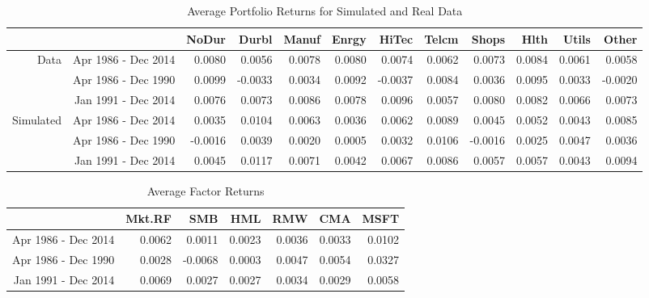 \documentclass[12pt]{article}
\begin{document}
\begin{table}[ht]
	\footnotesize
	\centering
	\begin{tabular}{rrrrrrrrrrrr}
		\hline
		& & NoDur & Durbl & Manuf & Enrgy & HiTec & Telcm & Shops & Hlth & Utils & Other \\ 
		\hline
		\multirow{3}{*}{Data} & Apr 1986 - Dec 2014 & 0.0080 & 0.0056 & 0.0078 & 0.0080 & 0.0074 & 0.0062 & 0.0073 & 0.0084 & 0.0061 & 0.0058 \\ 
		& Apr 1986 - Dec 1990 & 0.0099 & -0.0033 & 0.0034 & 0.0092 & -0.0037 & 0.0084 & 0.0036 & 0.0095 & 0.0033 & -0.0020 \\ 
		& Jan 1991 - Dec 2014 & 0.0076 & 0.0073 & 0.0086 & 0.0078 & 0.0096 & 0.0057 & 0.0080 & 0.0082 & 0.0066 & 0.0073 \\ 
		\hline
		\multirow{3}{*}{Simulated} & Apr 1986 - Dec 2014 & 0.0035 & 0.0104 & 0.0063 & 0.0036 & 0.0062 & 0.0089 & 0.0045 & 0.0052 & 0.0043 & 0.0085 \\ 
		& Apr 1986 - Dec 1990 & -0.0016 & 0.0039 & 0.0020 & 0.0005 & 0.0032 & 0.0106 & -0.0016 & 0.0025 & 0.0047 & 0.0036 \\ 
		& Jan 1991 - Dec 2014 & 0.0045 & 0.0117 & 0.0071 & 0.0042 & 0.0067 & 0.0086 & 0.0057 & 0.0057 & 0.0043 & 0.0094 \\ 
		\hline
	\end{tabular}
	\caption{Average Portfolio Returns for Simulated and Real Data}
\end{table}
\begin{table}[ht]
	\centering
	\footnotesize
	\begin{tabular}{rrrrrrr}
		\hline
		& Mkt.RF & SMB & HML & RMW & CMA & MSFT \\ 
		\hline
		 Apr 1986 - Dec 2014 & 0.0062 & 0.0011 & 0.0023 & 0.0036 & 0.0033 & 0.0102 \\ 
		Apr 1986 - Dec 1990 & 0.0028 & -0.0068 & 0.0003 & 0.0047 & 0.0054 & 0.0327 \\ 
		Jan 1991 - Dec 2014 & 0.0069 & 0.0027 & 0.0027 & 0.0034 & 0.0029 & 0.0058 \\ 
		\hline
	\end{tabular}
		\caption{Average Factor Returns}
\end{table}
\end{document}
